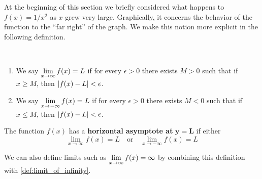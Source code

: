 At the beginning of this section we briefly considered what happens to $f(x) = 1/x^2$ as $x$ grew very large. 
Graphically, it concerns the behavior of the function to the ``far right'' of the graph. We make this notion more explicit in the following definition.

\begin{definition}\label{def:limit_at_infinity}%
~\\[-2\baselineskip]\begin{enumerate}
\item We say $\displaystyle\lim_{x\to\infty} f(x)=L$ if for every $\epsilon>0$ there exists $M>0$ such that if $x\geq M$, then $\left\lvert f(x)-L \right\rvert<\epsilon$.

\item We say $\displaystyle\lim_{x\to-\infty} f(x)=L$ if for every $\epsilon>0$ there exists $M<0$ such that if $x\leq M$, then $\left\lvert f(x)-L \right\rvert<\epsilon$.

\end{enumerate}
\end{definition}

\begin{definition}\label{def:horiz_asymp}%
The function $f(x)$ has a \textbf{horizontal asymptote at} $\mathbf{y=L}$ if either
\[\lim_{x\to \infty} f(x)=L \quad \text{or} \quad \lim_{x\to -\infty} f(x)=L\]
\end{definition}

We can also define limits such as $\displaystyle\lim_{x\to\infty}f(x)=\infty$ by combining this definition with \autoref{def:limit_of_infinity}. %

